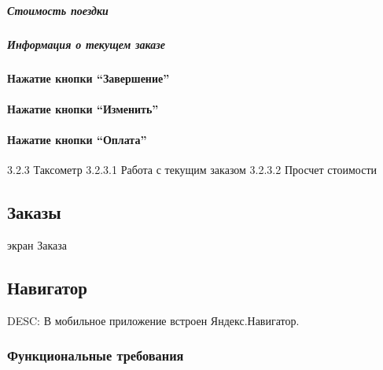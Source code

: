         \subparagraph{Стоимость поездки} \label{taximeter_functional_drive_costs}

        \subparagraph{Информация о текущем заказе} \label{taximeter_functional_curr_order_info}

      \paragraph{Нажатие кнопки “Завершение”} \label{taximeter_functional_end_button}

      \paragraph{Нажатие кнопки “Изменить”} \label{taximeter_functional_change_button}

      \paragraph{Нажатие кнопки “Оплата”} \label{taximeter_functional_checkout_button}

    3.2.3 Таксометр
    3.2.3.1 Работа с текущим заказом
    3.2.3.2 Просчет стоимости

  \subsection{Заказы} \label{driver_app_orders_tab}

    экран Заказа

  \subsection{Навигатор} \label{driver_app_navigator_tab}

    DESC: В мобильное приложение встроен Яндекс.Навигатор.

    \subsubsection{Функциональные требования}

